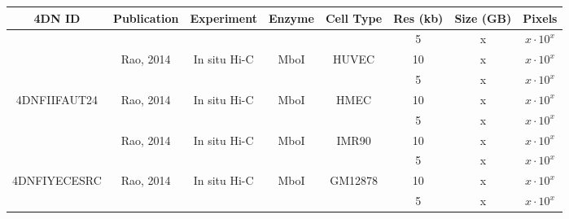 \begin{table}[h]
\begin{center}
\begin{tabular}{|cccccccc|}
\hline
\multicolumn{1}{|c|}{4DN ID} &
  \multicolumn{1}{c|}{Publication} &
  \multicolumn{1}{c|}{Experiment} &
  \multicolumn{1}{c|}{Enzyme} &
  \multicolumn{1}{c|}{Cell Type} &
  \multicolumn{1}{c|}{Res (kb)} &
  \multicolumn{1}{c|}{Size (GB)} &
  Pixels \\ \hline
\rowcolor[HTML]{EFEFEF} 
\cellcolor[HTML]{EFEFEF} &
  \cellcolor[HTML]{EFEFEF} &
  \cellcolor[HTML]{EFEFEF} &
  \cellcolor[HTML]{EFEFEF} &
  \cellcolor[HTML]{EFEFEF} &
  5 &
  x &
  $x \cdot 10^x$ \\
\rowcolor[HTML]{EFEFEF} 
\multirow{-2}{*}{\cellcolor[HTML]{EFEFEF}4DNFIYL35EHL} & 
  \multirow{-2}{*}{\cellcolor[HTML]{EFEFEF}Rao, 2014} &
  \multirow{-2}{*}{\cellcolor[HTML]{EFEFEF}In situ Hi-C} &
  \multirow{-2}{*}{\cellcolor[HTML]{EFEFEF}MboI} &
  \multirow{-2}{*}{\cellcolor[HTML]{EFEFEF}HUVEC} &
  10 &
  x &
  $x \cdot 10^x$ \\
 &
   &
   &
   &
   &
  5 &
  x &
  $x \cdot 10^x$ \\
\multirow{-2}{*}{4DNFIIFAUT24} &
  \multirow{-2}{*}{Rao, 2014} &
  \multirow{-2}{*}{In situ Hi-C} &
  \multirow{-2}{*}{MboI} &
  \multirow{-2}{*}{HMEC} &
  10 &
  x &
  $x \cdot 10^x$ \\
\rowcolor[HTML]{EFEFEF} 
\cellcolor[HTML]{EFEFEF} &
  \cellcolor[HTML]{EFEFEF} &
  \cellcolor[HTML]{EFEFEF} &
  \cellcolor[HTML]{EFEFEF} &
  \cellcolor[HTML]{EFEFEF} &
  5 &
  x &
  $x \cdot 10^x$ \\
\rowcolor[HTML]{EFEFEF} 
\multirow{-2}{*}{\cellcolor[HTML]{EFEFEF}4DNFIIG4IWKW} &
  \multirow{-2}{*}{\cellcolor[HTML]{EFEFEF}Rao, 2014} &
  \multirow{-2}{*}{\cellcolor[HTML]{EFEFEF}In situ Hi-C} &
  \multirow{-2}{*}{\cellcolor[HTML]{EFEFEF}MboI} &
  \multirow{-2}{*}{\cellcolor[HTML]{EFEFEF}IMR90} &
  10 &
  x &
  $x \cdot 10^x$ \\
 &
   &
   &
   &
   &
  5 &
  x &
  $x \cdot 10^x$ \\
\multirow{-2}{*}{4DNFIYECESRC} &
  \multirow{-2}{*}{Rao, 2014} &
  \multirow{-2}{*}{In situ Hi-C} &
  \multirow{-2}{*}{MboI} &
  \multirow{-2}{*}{GM12878} &
  10 &
  x &
  $x \cdot 10^x$ \\
\rowcolor[HTML]{EFEFEF} 
\cellcolor[HTML]{EFEFEF} &
  \cellcolor[HTML]{EFEFEF} &
  \cellcolor[HTML]{EFEFEF} &
  \cellcolor[HTML]{EFEFEF} &
  \cellcolor[HTML]{EFEFEF} &
  5 &
  x &
  $x \cdot 10^x$ \\

\end{tabular}
\end{center}
\end{table}

